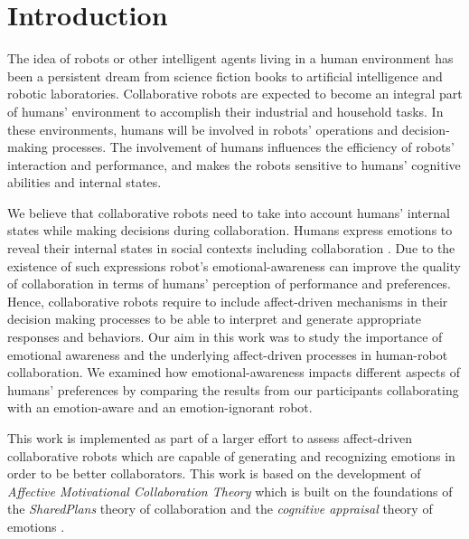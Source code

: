 \documentclass{sig-alternate-05-2015}
\begin{document}
%
%

%
%
\printccsdesc



\section{Introduction}
The idea of robots or other intelligent agents living in a human environment has
been a persistent dream from science fiction books to artificial intelligence
and robotic laboratories. Collaborative robots are expected to become an
integral part of humans' environment to accomplish their industrial and
household tasks. In these environments, humans will be involved in robots'
operations and decision-making processes. The involvement of humans influences
the efficiency of robots' interaction and performance, and makes the robots
sensitive to humans' cognitive abilities and internal states.

We believe that collaborative robots need to take into account humans' internal
states while making decisions during collaboration. Humans express emotions to
reveal their internal states in social contexts including collaboration
\cite{breazeal:sociable-interactive-robots}. Due to the existence of such
expressions robot's emotional-awareness can improve the quality of collaboration
in terms of humans' perception of performance and preferences. Hence,
collaborative robots require to include affect-driven mechanisms in their
decision making processes to be able to interpret and generate appropriate
responses and behaviors. Our aim in this work was to study the importance of
emotional awareness and the underlying affect-driven processes in human-robot
collaboration. We examined how emotional-awareness impacts different aspects of
humans' preferences by comparing the results from our participants collaborating
with an emotion-aware and an emotion-ignorant robot.

This work is implemented as part of a larger effort to assess affect-driven
collaborative robots which are capable of generating and recognizing emotions in
order to be better collaborators. This work is based on the development of
\textit{Affective Motivational Collaboration Theory} which is built on the
foundations of the \textit{SharedPlans} theory of collaboration
\cite{grosz:plans-discourse} and the \textit{cognitive appraisal} theory of
emotions \cite{gratch:domain-independent}.
\end{document}
